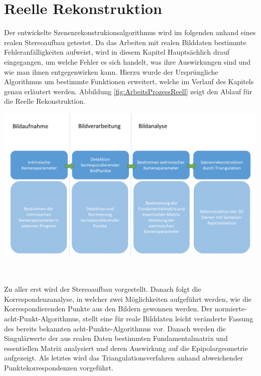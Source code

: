 \chapter{Reelle Rekonstruktion}
\label{sec:real} 

Der entwickelte Szenenrekonstrukionsalgorithmus wird im folgenden anhand eines realen Stereoaufbau getestet. Da das Arbeiten mit realen Bilddaten bestimmte Fehleranfälligkeiten aufweist, wird in diesem Kapitel Hauptsächlich drauf eingegangen, um welche Fehler es sich handelt, was ihre Auswirkungen sind und wie man ihnen entgegenwirken kann. Hierzu wurde der Ursprüngliche Algorithmus um bestimmte Funktionen erweitert, welche im Verlauf des Kapitels genau erläutert werden. Abbildung \ref{fig:ArbeitsProzessReell} zeigt den Ablauf für die Reelle Rekonstruktion. \\


\begin{minipage}{\linewidth}
	\centering
	\includegraphics[width=1.\linewidth]{images/NEU_real_Arbeitsprozess.png}
	\label{fig:ArbeitsProzessReell}
\end{minipage}\\ \\

Zu aller erst wird der Stereoaufbau vorgestellt. Danach folgt die Korrespondenzanalyse, in welcher zwei Möglichkeiten aufgeführt werden, wie die Korrespondierenden Punkte aus den Bildern gewonnen werden. Der normierte-acht-Punkt-Algorithmus, stellt eine für reale Bilddaten leicht veränderte Fassung des bereits bekannten acht-Punkte-Algorithmus vor. Danach werden die Singulärwerte der aus realen Daten bestimmten Fundamentalmatrix und essentiellen Matrix analysiert und deren Auswirkung auf die Epipolargeometrie aufgezeigt. Als letztes wird das Triangulationsverfahren anhand abweichender Punktekorrespondenzen vorgeführt.


